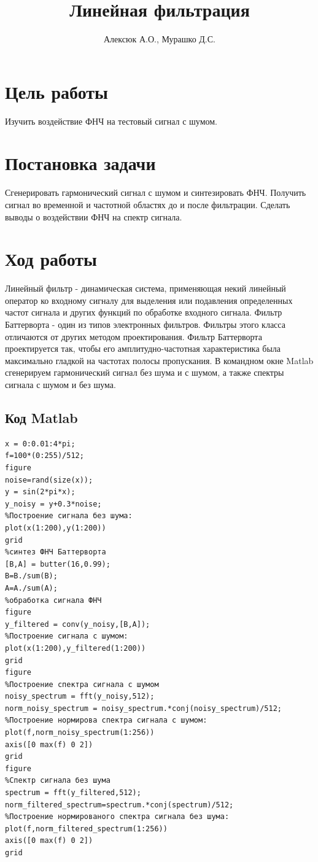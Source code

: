 \documentclass[a4paper, 12pt]{article}
\author{Алексюк А.О., Мурашко Д.С.}
\title{Линейная фильтрация}
\begin{document}
\maketitle
\tableofcontents
\pagebreak

\section{Цель работы}
Изучить воздействие ФНЧ на тестовый сигнал с шумом.

\section{Постановка задачи}
Сгенерировать гармонический сигнал с шумом и синтезировать ФНЧ. Получить сигнал во временной и частотной областях до и после фильтрации. Сделать выводы о воздействии ФНЧ на спектр сигнала.

\section{Ход работы}
Линейный фильтр - динамическая система, применяющая некий линейный оператор ко входному сигналу для выделения или подавления определенных частот сигнала и других функций по обработке входного сигнала.
Фильтр Баттерворта - один из типов электронных фильтров. Фильтры этого класса отличаются от других методом проектирования. Фильтр Баттерворта проектируется так, чтобы его амплитудно-частотная характеристика
была максимально гладкой на частотах полосы пропускания.
В командном окне Matlab сгенерируем гармонический сигнал без шума
и с шумом, а также спектры сигнала с шумом и без шума. 

\subsection{Код Matlab}
\begin{lstlisting}
x = 0:0.01:4*pi;
f=100*(0:255)/512;
figure
noise=rand(size(x));
y = sin(2*pi*x);
y_noisy = y+0.3*noise;
%Построение сигнала без шума:
plot(x(1:200),y(1:200))
grid
%синтез ФНЧ Баттерворта
[B,A] = butter(16,0.99);
B=B./sum(B);
A=A./sum(A);
%обработка сигнала ФНЧ
figure
y_filtered = conv(y_noisy,[B,A]);
%Построение сигнала с шумом:
plot(x(1:200),y_filtered(1:200))
grid
figure
%Построение спектра сигнала с шумом
noisy_spectrum = fft(y_noisy,512);
norm_noisy_spectrum = noisy_spectrum.*conj(noisy_spectrum)/512;
%Построение нормирова спектра сигнала с шумом:
plot(f,norm_noisy_spectrum(1:256))
axis([0 max(f) 0 2])
grid
figure
%Спектр сигнала без шума
spectrum = fft(y_filtered,512);
norm_filtered_spectrum=spectrum.*conj(spectrum)/512;
%Построение нормированого спектра сигнала без шума:
plot(f,norm_filtered_spectrum(1:256))
axis([0 max(f) 0 2])
grid

\end{lstlisting}
\end{document}

